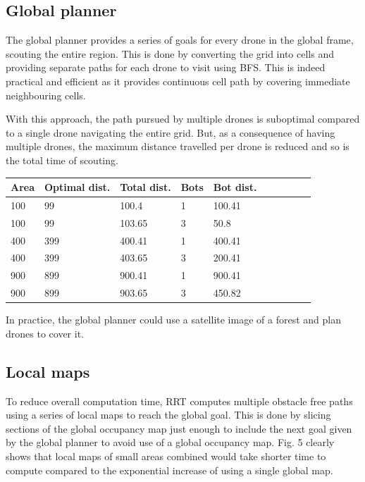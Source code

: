  
\subsection{Global planner}

The global planner provides a series of goals for every drone in the global frame, scouting the entire region. This is done by converting the grid into cells and providing separate paths for each drone to visit using BFS. This is indeed practical and efficient as it provides continuous cell path by covering immediate neighbouring cells.

With this approach, the path pursued by multiple drones is suboptimal compared to a single drone navigating the entire grid. But, as a consequence of having multiple drones, the maximum distance travelled per drone is reduced and so is the total time of scouting.


\begin{table}[!ht]
    \centering
    \begin{tabular}{|l|l|l|l|l|l|l|l|l|l|}
    \hline
        Area & Optimal dist. & Total dist. & Bots & Bot dist.\\ \hline
        100 & 99 & 100.4 & 1 & 100.41 \\ \hline
        100 & 99 & 103.65 & 3 & 50.8 \\ \hline
        400 & 399 & 400.41 & 1 & 400.41 \\ \hline
        400 & 399 & 403.65 & 3 & 200.41 \\ \hline
        900 & 899 & 900.41 & 1 & 900.41 \\ \hline
        900 & 899 & 903.65 & 3 & 450.82 \\ \hline
    \end{tabular}
\end{table}

In practice, the global planner could use a satellite image of a forest and plan drones to cover it. 


\subsection{Local maps}

To reduce overall computation time, RRT computes multiple obstacle free paths
using a series of local maps to reach the global goal. This is done by slicing sections of the global occupancy map just enough to include the next goal given by the global planner to avoid use of a global occupancy map. Fig. 5 clearly shows that local maps of small areas combined would take shorter time to compute compared to the exponential increase of using a single global map.

